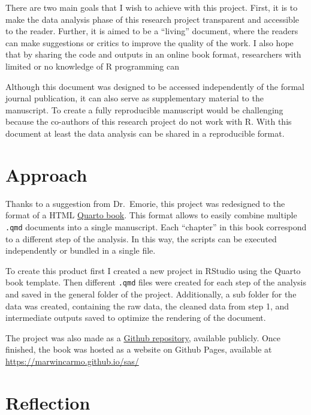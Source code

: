 \documentclass[
  letterpaper,
  DIV=11,
  numbers=noendperiod]{scrreprt}
\begin{document}

There are two main goals that I wish to achieve with this project.
First, it is to make the data analysis phase of this research project
transparent and accessible to the reader. Further, it is aimed to be a
``living'' document, where the readers can make suggestions or critics
to improve the quality of the work. I also hope that by sharing the code
and outputs in an online book format, researchers with limited or no
knowledge of R programming can

Although this document was designed to be accessed independently of the
formal journal publication, it can also serve as supplementary material
to the manuscript. To create a fully reproducible manuscript would be
challenging because the co-authors of this research project do not work
with R. With this document at least the data analysis can be shared in a
reproducible format.

\hypertarget{approach}{%
\section*{Approach}\label{approach}}


Thanks to a suggestion from Dr.~Emorie, this project was redesigned to
the format of a HTML \href{https://quarto.org/docs/books/}{Quarto book}.
This format allows to easily combine multiple \texttt{.qmd} documents
into a single manuscript. Each ``chapter'' in this book correspond to a
different step of the analysis. In this way, the scripts can be executed
independently or bundled in a single file.

To create this product first I created a new project in RStudio using
the Quarto book template. Then different \texttt{.qmd} files were
created for each step of the analysis and saved in the general folder of
the project. Additionally, a sub folder for the data was created,
containing the raw data, the cleaned data from step 1, and intermediate
outputs saved to optimize the rendering of the document.

The project was also made as a
\href{https://github.com/marwincarmo/sas}{Github repository}, available
publicly. Once finished, the book was hosted as a website on Github
Pages, available at \url{https://marwincarmo.github.io/sas/}

\hypertarget{reflection}{%
\section*{Reflection}\label{reflection}}
\end{document}
